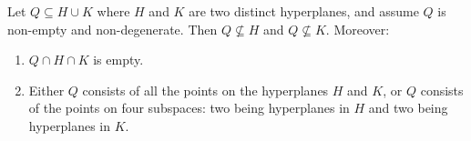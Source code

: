 Let $Q \subseteq H \cup K$ where $H$ and $K$ are two distinct hyperplanes, and assume $Q$ is non-empty and non-degenerate. Then $Q \not\subseteq H$ and $Q \not\subseteq K$. Moreover:

\begin{enumerate}
\item[(i)] $Q \cap H \cap K$ is empty.
\item[(ii)] Either $Q$ consists of all the points on the hyperplanes $H$ and $K$, or $Q$ consists of the points on four subspaces: two being hyperplanes in $H$ and two being hyperplanes in $K$.
\end{enumerate}
